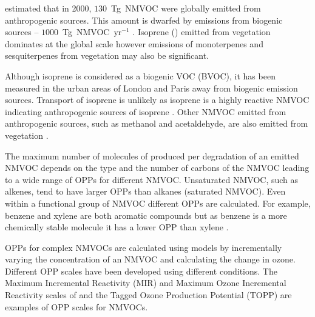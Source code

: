 \citet{Lamarque:2010} estimated that in 2000, $130$~Tg~NMVOC were globally emitted from anthropogenic sources.
This amount is dwarfed by emissions from biogenic sources -- $1000$~Tg~NMVOC~yr$^{-1}$ \citep{Guenther:2012}.
Isoprene () emitted from vegetation dominates at the global scale however emissions of monoterpenes and sesquiterpenes from vegetation may also be significant.

Although isoprene is considered as a biogenic VOC (BVOC), it has been measured in the urban areas of London and Paris away from biogenic emission sources.
Transport of isoprene is unlikely as isoprene is a highly reactive NMVOC indicating anthropogenic sources of isoprene \citep{vonSchneidemesser:2011}.
Other NMVOC emitted from anthropogenic sources, such as methanol and acetaldehyde, are also emitted from vegetation \citep{Guenther:2012}.

The maximum number of molecules of  produced per degradation of an emitted NMVOC depends on the type and the number of carbons of the NMVOC leading to a wide range of OPPs for different NMVOC.
Unsaturated NMVOC, such as alkenes, tend to have larger OPPs than alkanes (saturated NMVOC).
Even within a functional group of NMVOC different OPPs are calculated.
For example, benzene and xylene are both aromatic compounds but as benzene is a more chemically stable molecule it has a lower OPP than xylene \citep{Carter:1994}.

OPPs for complex NMVOCs are calculated using models by incrementally varying the concentration of an NMVOC and calculating the change in ozone.
Different OPP scales have been developed using different  conditions.
The Maximum Incremental Reactivity (MIR) and Maximum Ozone Incremental Reactivity scales of \citet{Carter:1994} and the Tagged Ozone Production Potential (TOPP) are examples of OPP scales for NMVOCs.

